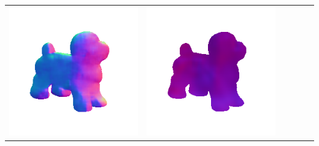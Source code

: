 \begin{tabularx}{\linewidth}{@{}Y@{}Y@{}Y@{}Y@{}Y@{}Y@{}}
\includegraphics[width=\linewidth]{semisynthetic/20150514_17_marrnet_out.png} &
\includegraphics[width=\linewidth]{semisynthetic/20150514_17_ef_out.png} \\

\end{tabularx}
